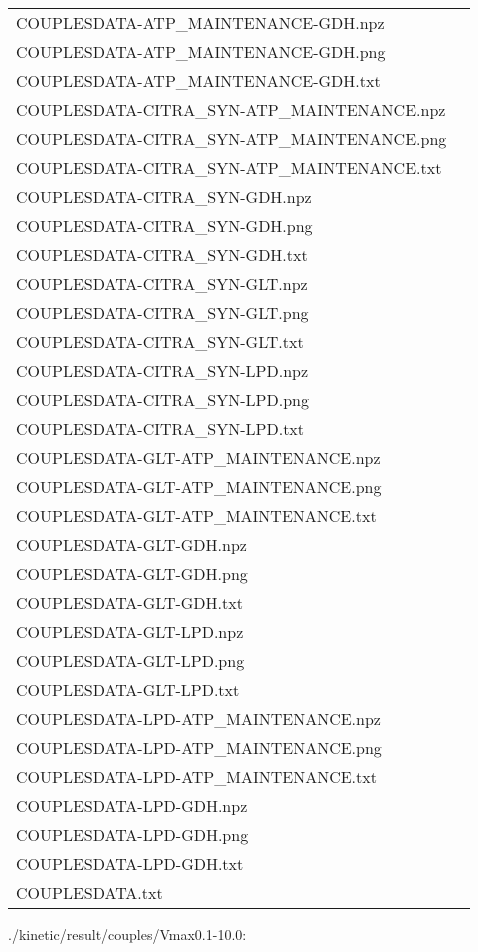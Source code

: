 \documentclass[a4paper, parskip=full]{scrreprt}
\begin{document}
\begin{longtable}{ll}
COUPLESDATA-ATP\_MAINTENANCE-GDH.npz\\
COUPLESDATA-ATP\_MAINTENANCE-GDH.png\\
COUPLESDATA-ATP\_MAINTENANCE-GDH.txt\\
COUPLESDATA-CITRA\_SYN-ATP\_MAINTENANCE.npz\\
COUPLESDATA-CITRA\_SYN-ATP\_MAINTENANCE.png\\
COUPLESDATA-CITRA\_SYN-ATP\_MAINTENANCE.txt\\
COUPLESDATA-CITRA\_SYN-GDH.npz\\
COUPLESDATA-CITRA\_SYN-GDH.png\\
COUPLESDATA-CITRA\_SYN-GDH.txt\\
COUPLESDATA-CITRA\_SYN-GLT.npz\\
COUPLESDATA-CITRA\_SYN-GLT.png\\
COUPLESDATA-CITRA\_SYN-GLT.txt\\
COUPLESDATA-CITRA\_SYN-LPD.npz\\
COUPLESDATA-CITRA\_SYN-LPD.png\\
COUPLESDATA-CITRA\_SYN-LPD.txt\\
COUPLESDATA-GLT-ATP\_MAINTENANCE.npz\\
COUPLESDATA-GLT-ATP\_MAINTENANCE.png\\
COUPLESDATA-GLT-ATP\_MAINTENANCE.txt\\
COUPLESDATA-GLT-GDH.npz\\
COUPLESDATA-GLT-GDH.png\\
COUPLESDATA-GLT-GDH.txt\\
COUPLESDATA-GLT-LPD.npz\\
COUPLESDATA-GLT-LPD.png\\
COUPLESDATA-GLT-LPD.txt\\
COUPLESDATA-LPD-ATP\_MAINTENANCE.npz\\
COUPLESDATA-LPD-ATP\_MAINTENANCE.png\\
COUPLESDATA-LPD-ATP\_MAINTENANCE.txt\\
COUPLESDATA-LPD-GDH.npz\\
COUPLESDATA-LPD-GDH.png\\
COUPLESDATA-LPD-GDH.txt\\
COUPLESDATA.txt
\end{longtable}

./kinetic/result/couples/Vmax0.1-10.0:
\end{document}
